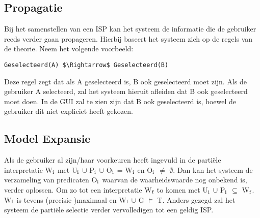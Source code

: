 \subsection{Propagatie}
Bij het samenstellen van een ISP kan het systeem de informatie die de gebruiker reeds verder gaan propageren. Hierbij baseert het systeem zich op de regels van de theorie. Neem het volgende voorbeeld: 
\begin{lstlisting}[mathescape]
Geselecteerd(A) $\Rightarrow$ Geselecteerd(B)
\end{lstlisting}
Deze regel zegt dat als A geselecteerd is, B ook geselecteerd moet zijn. Als de gebruiker A selecteerd, zal het systeem hieruit afleiden dat B ook geselecteerd moet doen. In de GUI zal te zien zijn dat B ook geselecteerd is, hoewel de gebruiker dit niet expliciet heeft gekozen.

\subsection{Model Expansie}
Als de gebruiker al zijn/haar voorkeuren heeft ingevuld in de parti\"{e}le interpretatie W$\textsubscript{i}$ met U$\textsubscript{i}$ $\cup$ P$\textsubscript{i}$ $\cup$ O$\textsubscript{i}$ = W$\textsubscript{i}$ en O$\textsubscript{i}$ $\neq$ $\emptyset$. Dan kan het systeem de verzameling van predicaten O$\textsubscript{i}$ waarvan de waarheidswaarde nog onbekend is, verder oplossen. Om zo tot een interpretatie W$\textsubscript{f}$ to komen met U$\textsubscript{i}$ $\cup$ P$\textsubscript{i}$ $\subseteq$ W$\textsubscript{f}$. W$\textsubscript{f}$ is tevens (precisie )maximaal en W$\textsubscript{f}$ $\cup$ G $\models$ T. Anders gezegd zal het systeem de parti\"{e}le selectie verder vervolledigen tot een geldig ISP. 

